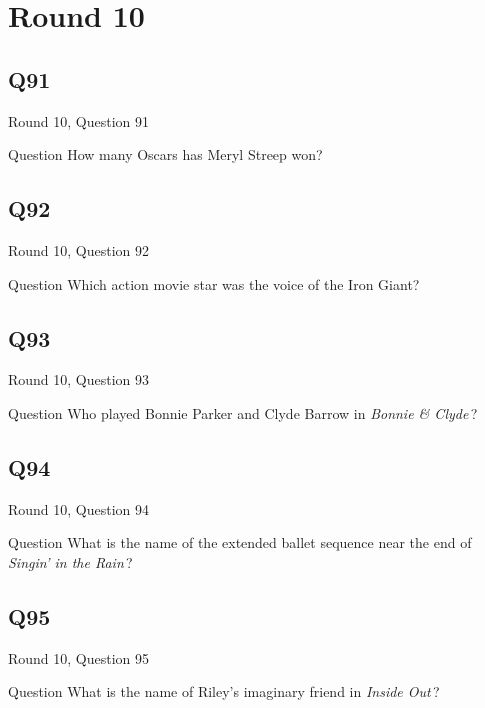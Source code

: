 \documentclass[11pt]{beamer}
\begin{document}
\section{Round 10}
    

\subsection*{Q91}
\begin{frame}[t]{Round 10, Question 91}
\vspace{2em}
\begin{block}{Question}
How many Oscars has Meryl Streep won?
\end{block}
\end{frame}
    

\subsection*{Q92}
\begin{frame}[t]{Round 10, Question 92}
\vspace{2em}
\begin{block}{Question}
Which action movie star was the voice of the Iron Giant?
\end{block}
\end{frame}
    

\subsection*{Q93}
\begin{frame}[t]{Round 10, Question 93}
\vspace{2em}
\begin{block}{Question}
Who played Bonnie Parker and Clyde Barrow in \emph{Bonnie \& Clyde}\,?
\end{block}
\end{frame}
    

\subsection*{Q94}
\begin{frame}[t]{Round 10, Question 94}
\vspace{2em}
\begin{block}{Question}
What is the name of the extended ballet sequence near the end of \emph{Singin' in the Rain}\,?
\end{block}
\end{frame}
    

\subsection*{Q95}
\begin{frame}[t]{Round 10, Question 95}
\vspace{2em}
\begin{block}{Question}
What is the name of Riley's imaginary friend in \emph{Inside Out}\,?
\end{block}
\end{frame}
    
\end{document}
